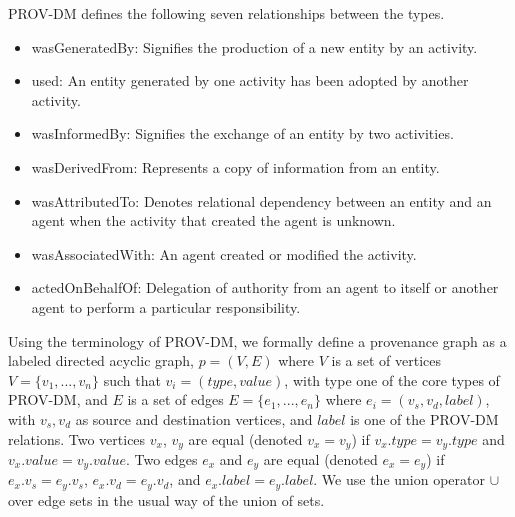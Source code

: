 \par PROV-DM defines the following seven relationships between the types. 

\begin{itemize}
\item wasGeneratedBy: Signifies the production of a new entity by an activity. 

\item used: An entity generated by one activity has been adopted by another activity.

\item wasInformedBy: Signifies the exchange of an entity by two activities.

\item wasDerivedFrom: Represents a copy of information from an entity. 

\item wasAttributedTo: Denotes relational dependency between an entity and an agent when the activity that created the agent is unknown.

\item wasAssociatedWith: An agent created or modified the activity.

\item actedOnBehalfOf: Delegation of authority from an agent to itself or another agent to perform a particular responsibility. 



\end{itemize}


Using the terminology of PROV-DM, we formally define a provenance graph as a labeled directed acyclic graph, $p = (V,E)$ where $V$ is a set of vertices $V =\{v_1,...,v_n\}$ such that $v_i = (type, value)$, with type one of the core types of PROV-DM, and $E$ is a set of edges $E =\{e_1,..., e_n\}$ where $e_i = (v_s, v_d, label)$, with $v_s, v_d$ as source and destination vertices, and $label$ is one of the PROV-DM relations. Two vertices $v_x$, $v_y$ are equal (denoted $ v_x = v_y$) if $v_x.type = v_y.type$ and $v_x.value = v_y.value$. Two edges $e_x $ and $e_y$ are equal (denoted $e_x = e_y$) if $e_x.v_s = e_y.v_s$, $e_x.v_d = e_y.v_d$, and $e_x.label = e_y.label$.  We use the union operator $\cup$ over edge sets in the usual way of the union of sets.



